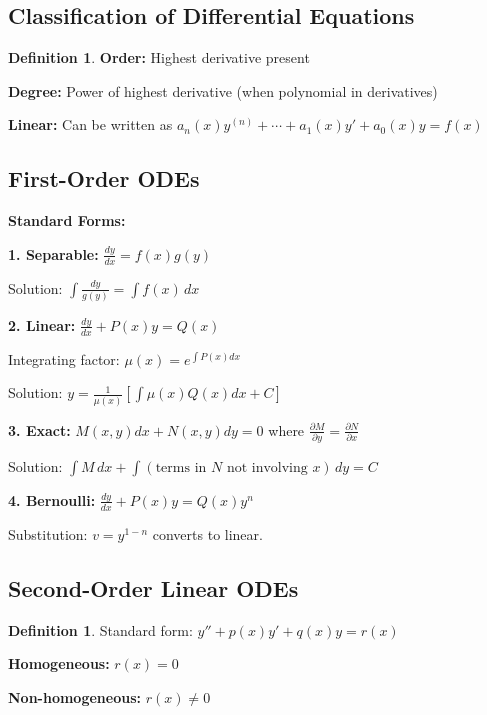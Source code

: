 \documentclass[12pt,a4paper]{article}
\theoremstyle{definition}
\newtheorem{definition}[theorem]{Definition}
\begin{document}
\subsection{Classification of Differential Equations}

\begin{definition}
\textbf{Order:} Highest derivative present

\textbf{Degree:} Power of highest derivative (when polynomial in derivatives)

\textbf{Linear:} Can be written as $a_n(x)y^{(n)} + \cdots + a_1(x)y' + a_0(x)y = f(x)$
\end{definition}

\subsection{First-Order ODEs}

\begin{importantbox}
\textbf{Standard Forms:}

\textbf{1. Separable:} $\frac{dy}{dx} = f(x)g(y)$

Solution: $\int \frac{dy}{g(y)} = \int f(x)\,dx$

\textbf{2. Linear:} $\frac{dy}{dx} + P(x)y = Q(x)$

Integrating factor: $\mu(x) = e^{\int P(x)dx}$

Solution: $y = \frac{1}{\mu(x)}\left[\int \mu(x)Q(x)dx + C\right]$

\textbf{3. Exact:} $M(x,y)dx + N(x,y)dy = 0$ where $\frac{\partial M}{\partial y} = \frac{\partial N}{\partial x}$

Solution: $\int M\,dx + \int (\text{terms in } N \text{ not involving } x)\,dy = C$

\textbf{4. Bernoulli:} $\frac{dy}{dx} + P(x)y = Q(x)y^n$

Substitution: $v = y^{1-n}$ converts to linear.
\end{importantbox}

\subsection{Second-Order Linear ODEs}

\begin{definition}
Standard form: $y'' + p(x)y' + q(x)y = r(x)$

\textbf{Homogeneous:} $r(x) = 0$

\textbf{Non-homogeneous:} $r(x) \neq 0$
\end{definition}
\end{document}
